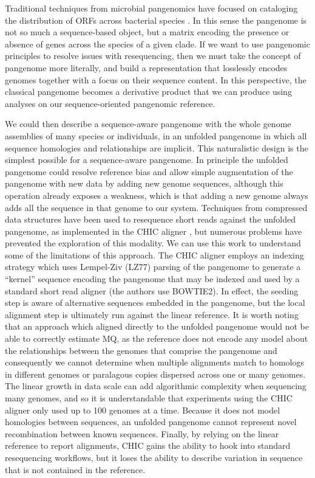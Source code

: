 Traditional techniques from microbial pangenomics have focused on cataloging the distribution of ORFs across bacterial species \cite{page2015roary}.
In this sense the pangenome is not so much a sequence-based object, but a matrix encoding the presence or absence of genes across the species of a given clade.
If we want to use pangenomic principles to resolve issues with resequencing, then we must take the concept of pangenome more literally, and build a representation that losslessly encodes genomes together with a focus on their sequence content.
In this perspective, the classical pangenome becomes a derivative product that we can produce using analyses on our sequence-oriented pangenomic reference.

We could then describe a sequence-aware pangenome with the whole genome assemblies of many species or individuals, in an unfolded pangenome in which all sequence homologies and relationships are implicit.
This naturalistic design is the simplest possible for a sequence-aware pangenome.
In principle the unfolded pangenome could resolve reference bias and allow simple augmentation of the pangenome with new data by adding new genome sequences, although this operation already exposes a weakness, which is that adding a new genome always adds all the sequence in that genome to our system.
Techniques from compressed data structures have been used to resequence short reads against the unfolded pangenome, as implemented in the CHIC aligner \cite{valenzuela2017chic}, but numerous problems have prevented the exploration of this modality.
We can use this work to understand some of the limitations of this approach.
The CHIC aligner employs an indexing strategy which uses Lempel-Ziv (LZ77) \cite{ziv1977universal} parsing of the pangenome to generate a ``kernel'' sequence encoding the pangenome that may be indexed and used by a standard short read aligner (the authors use BOWTIE2).
In effect, the seeding step is aware of alternative sequences embedded in the pangenome, but the local alignment step is ultimately run against the linear reference.
It is worth noting that an approach which aligned directly to the unfolded pangenome would not be able to correctly estimate MQ, as the reference does not encode any model about the relationships between the genomes that comprise the pangenome and consequently we cannot determine when multiple alignments match to homologs in different genomes or paralagous copies dispersed across one or many genomes.
The linear growth in data scale can add algorithmic complexity when sequencing many genomes, and so it is understandable that experiments using the CHIC aligner only used up to 100 genomes at a time.
Because it does not model homologies between sequences, an unfolded pangenome cannot represent novel recombination between known sequences.
Finally, by relying on the linear reference to report alignments, CHIC gains the ability to hook into standard resequencing workflows, but it loses the ability to describe variation in sequence that is not contained in the reference.

